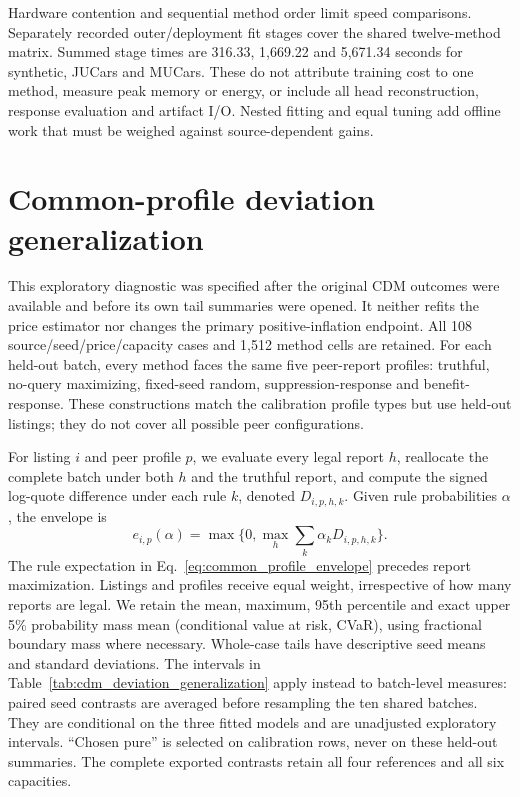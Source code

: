 \documentclass[10pt,journal]{IEEEtran}
\begin{document}
Hardware contention and sequential method order limit speed comparisons.
Separately recorded outer/deployment fit stages cover the shared twelve-method
matrix. Summed stage times are 316.33, 1,669.22 and 5,671.34 seconds for
synthetic, JUCars and MUCars. These do not attribute training cost to one
method, measure peak memory or energy, or include all head reconstruction,
response evaluation and artifact I/O. Nested fitting and equal tuning add
offline work that must be weighed against source-dependent gains.


\section{Common-profile deviation generalization}
\label{sec:cdm_deviation_generalization}
This exploratory diagnostic was specified after the original CDM outcomes
were available and before its own tail summaries were opened. It neither
refits the price estimator nor changes the primary positive-inflation
endpoint. All 108 source/seed/price/capacity cases and 1,512 method cells
are retained. For each held-out batch, every method faces the same five
peer-report profiles: truthful, no-query maximizing, fixed-seed random,
suppression-response and benefit-response. These constructions match the
calibration profile types but use held-out listings; they do not cover
all possible peer configurations.

For listing $i$ and peer profile $p$, we evaluate every legal report $h$,
reallocate the complete batch under both $h$ and the truthful report, and
compute the signed log-quote difference under each rule $k$, denoted
$D_{i,p,h,k}$. Given rule probabilities $\alpha$, the envelope is
\begin{equation}
 e_{i,p}(\alpha)=\max\{0,\max_h\sum_k\alpha_kD_{i,p,h,k}\}.
\label{eq:common_profile_envelope}
\end{equation}
The rule expectation in Eq.~\eqref{eq:common_profile_envelope} precedes
report maximization. Listings and profiles
receive equal weight, irrespective of how many reports are legal. We
retain the mean, maximum, 95th percentile and exact upper 5\% probability
mass mean (conditional value at risk, CVaR), using fractional boundary mass
where necessary. Whole-case
tails have descriptive seed means and standard deviations. The intervals
in Table~\ref{tab:cdm_deviation_generalization} apply instead to batch-level
measures: paired seed contrasts are averaged before resampling the ten
shared batches. They are conditional on the three fitted models and are
unadjusted exploratory intervals. ``Chosen pure'' is selected on calibration
rows, never on these held-out summaries. The complete exported contrasts
retain all four references and all six capacities.
\end{document}
